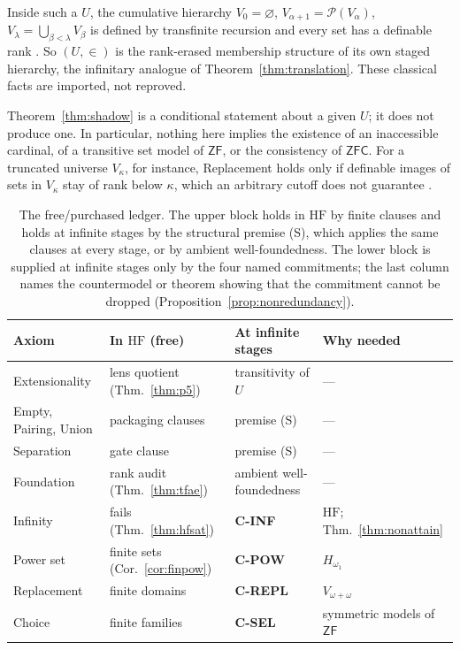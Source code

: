 \documentclass[11pt]{article}
\newcommand{\HF}{\mathrm{HF}}                 \newcommand{\rank}{\operatorname{rank}}
\newcommand{\powset}{\mathcal{P}}
\theoremstyle{definition}
\begin{document}
Inside such a $U$, the cumulative hierarchy $V_0=\varnothing$, $V_{\alpha+1}=\powset(V_\alpha)$,
$V_\lambda=\bigcup_{\beta<\lambda}V_\beta$ is defined by transfinite recursion \citep{Zermelo1930}
and every set has a definable rank \citep[Ch.~6]{Jech2003}. So $(U,\in)$ is the rank-erased
membership structure of its own staged hierarchy, the infinitary analogue of
Theorem~\ref{thm:translation}. These classical facts are imported, not reproved.

Theorem~\ref{thm:shadow} is a conditional statement about a given $U$; it does not produce one.
In particular, nothing here implies the existence of an inaccessible cardinal, of a transitive set
model of $\mathsf{ZF}$, or the consistency of $\mathsf{ZFC}$. For a truncated universe $V_\kappa$,
for instance, Replacement holds only if definable images of sets in $V_\kappa$ stay of rank below
$\kappa$, which an arbitrary cutoff does not guarantee \citep{MontagueVaught1959}.

\begin{table}[tbp]\centering
\small
\begin{tabular}{@{}llll@{}}
\toprule
Axiom & In $\HF$ (free) & At infinite stages & Why needed \\
\midrule
Extensionality & lens quotient (Thm.~\ref{thm:p5}) & transitivity of $U$ & --- \\
Empty, Pairing, Union & packaging clauses & premise (S) & --- \\
Separation & gate clause & premise (S) & --- \\
Foundation & rank audit (Thm.~\ref{thm:tfae}) & ambient well-foundedness & --- \\
\midrule
Infinity & fails (Thm.~\ref{thm:hfsat}) & \textbf{C-INF} & $\HF$; Thm.~\ref{thm:nonattain} \\
Power set & finite sets (Cor.~\ref{cor:finpow}) & \textbf{C-POW} & $H_{\omega_1}$ \\
Replacement & finite domains & \textbf{C-REPL} & $V_{\omega+\omega}$ \\
Choice & finite families & \textbf{C-SEL} & symmetric models of $\mathsf{ZF}$ \\
\bottomrule
\end{tabular}
\caption{The free/purchased ledger. The upper block holds in $\HF$ by finite clauses and holds at
infinite stages by the structural premise (S), which applies the same clauses at every stage, or
by ambient well-foundedness. The lower block is supplied at infinite stages only by the four named
commitments; the last column names the countermodel or theorem showing that the commitment cannot
be dropped (Proposition~\ref{prop:nonredundancy}).}
\label{tab:factorization}
\end{table}
\end{document}
